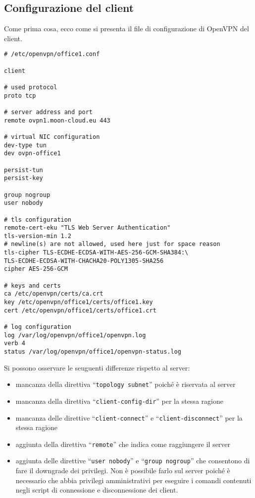 \subsection{Configurazione del client}
Come prima cosa, ecco come si presenta il file di configurazione di OpenVPN
del client.
\begin{verbatim}
# /etc/openvpn/office1.conf

client

# used protocol
proto tcp

# server address and port
remote ovpn1.moon-cloud.eu 443

# virtual NIC configuration
dev-type tun
dev ovpn-office1

persist-tun
persist-key

group nogroup
user nobody

# tls configuration
remote-cert-eku "TLS Web Server Authentication"
tls-version-min 1.2
# newline(s) are not allowed, used here just for space reason
tls-cipher TLS-ECDHE-ECDSA-WITH-AES-256-GCM-SHA384:\
TLS-ECDHE-ECDSA-WITH-CHACHA20-POLY1305-SHA256
cipher AES-256-GCM

# keys and certs
ca /etc/openvpn/certs/ca.crt
key /etc/openvpn/office1/certs/office1.key
cert /etc/openvpn/office1/certs/office1.crt

# log configuration
log /var/log/openvpn/office1/openvpn.log
verb 4
status /var/log/openvpn/office1/openvpn-status.log
\end{verbatim}
Si possono osservare le seuguenti differenze rispetto al server:
\begin{itemize}
  \item mancanza della direttiva ``\texttt{topology subnet}'' poiché è
  riservata al server
  \item mancanza della direttiva ``\texttt{client-config-dir}'' per la stessa
  ragione
  \item mancanza delle direttive ``\texttt{client-connect}'' e
  ``\texttt{client-disconnect}'' per la stessa ragione
  \item aggiunta della direttiva ``\texttt{remote}'' che indica come raggiungere
  il server
  \item aggiunta delle direttive ``\texttt{user nobody}'' e ``\texttt{group nogroup}''
  che consentono di fare il downgrade dei privilegi. Non è possibile farlo sul
  server poiché è necessario che abbia privilegi amministrativi per eseguire i
  comandi contenuti negli script di connessione e disconnessione dei client.
\end{itemize}
